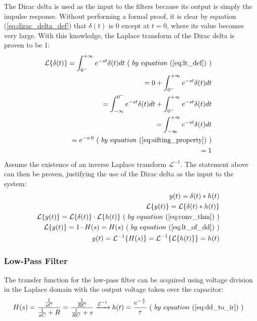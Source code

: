 \documentclass{article}
\begin{document}
	The Dirac delta is used as the input to the filters because its output is simply the impulse response. Without performing a formal proof, it is clear by equation (\ref{eq:dirac_delta_def}) that $\delta(t)$ is 0 except at $t = 0$, where its value becomes very large. With this knowledge, the Laplace transform of the Dirac delta is proven to be 1:
	\begin{equation}
	\label{eq:lt_of_dd}
	\begin{aligned}
	\mathcal{L}\{\delta(t)\} = \int_{0^{-}}^{+\infty} e^{-st}\delta(t)dt \ ( \ by \ equation \ (\ref{eq:lt_def}) \ ) \\
	= 0 + \int_{0^{-}}^{+\infty} e^{-st}\delta(t)dt \\
	= \int_{-\infty}^{0^{-}} e^{-st}\delta(t)dt + \int_{0^{-}}^{+\infty} e^{-st}\delta(t)dt \\
	= \int_{-\infty}^{+\infty} e^{-st}\delta(t)dt \\
	= e^{-s \cdot 0} \ ( \ by \ equation \ (\ref{eq:sifting_property}) \ ) \\
	= 1
	\end{aligned}
	\end{equation}
	Assume the existence of an inverse Laplace transform $\mathcal{L}^{-1}$. The statement above can then be proven, justifying the use of the Dirac delta as the input to the system:
	\begin{equation}
	\label{eq:dd_to_ir}
	\begin{aligned}
	y(t) = \delta(t) * h(t) \\
	\mathcal{L}\{y(t)\} = \mathcal{L}\{\delta(t) * h(t)\} \\
	\mathcal{L}\{y(t)\} = \mathcal{L}\{\delta(t)\} \cdot \mathcal{L}\{h(t)\} \ ( \ by \ equation \ (\ref{eq:conv_thm}) \ ) \\
	\mathcal{L}\{y(t)\} = 1 \cdot H(s) = H(s) \ ( \ by \ equation \ (\ref{eq:lt_of_dd}) \ ) \\
	y(t) = \mathcal{L}^{-1}\{H(s)\} = \mathcal{L}^{-1}\{\mathcal{L}\{h(t)\}\} = h(t)
	\end{aligned}
	\end{equation}
	
	\subsubsection{Low-Pass Filter}
	The transfer function for the low-pass filter can be acquired using voltage division in the Laplace domain with the output voltage taken over the capacitor:
	\begin{equation}
	\label{eq:tf_lpf}
	H(s) = \frac{ \frac{ 1 }{ sC } }{ \frac{ 1 }{ sC } + R } = \frac{ \frac{ 1 }{ RC } }{ \frac{ 1 }{ RC } + s } \xrightarrow{\mathcal{L}^{-1}} h(t) = \frac{ e^{-\frac{t}{\tau}} }{ \tau } \ ( \ by \ equation \ (\ref{eq:dd_to_ir}) \ )
	\end{equation}
	
\end{document}
